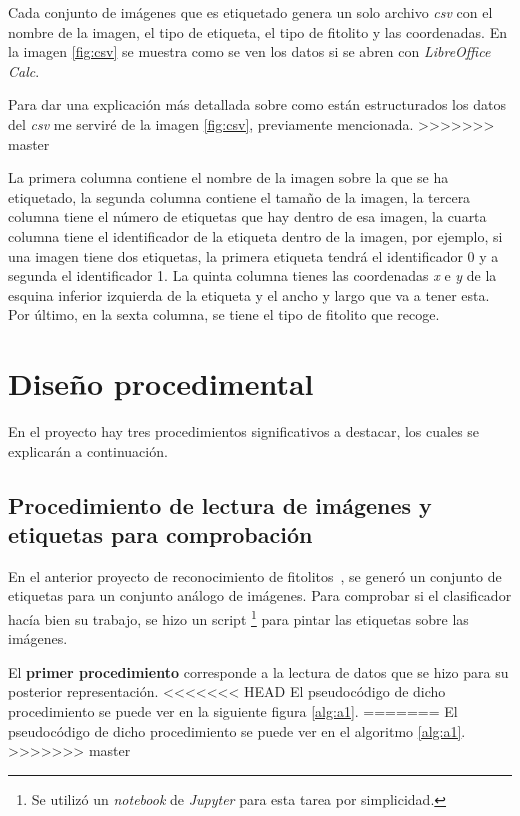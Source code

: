Cada conjunto de imágenes que es etiquetado genera un solo archivo \textit{csv} con el nombre de la imagen, el tipo de etiqueta, el tipo de fitolito y las coordenadas. En la imagen \ref{fig:csv} se muestra como se ven los datos si se abren con \textit{LibreOffice Calc}.

Para dar una explicación más detallada sobre como están estructurados los datos del \textit{csv} me serviré de la imagen \ref{fig:csv}, previamente mencionada.
>>>>>>> master

La primera columna contiene el nombre de la imagen sobre la que se ha etiquetado, la segunda columna contiene el tamaño de la imagen, la tercera columna tiene el número de etiquetas que hay dentro de esa imagen, la cuarta columna tiene el identificador de la etiqueta dentro de la imagen, por ejemplo, si una imagen tiene dos etiquetas, la primera etiqueta tendrá el identificador 0 y a segunda el identificador 1. La quinta columna tienes las coordenadas \textit{x} e \textit{y} de la esquina inferior izquierda de la etiqueta y el ancho y largo que va a tener esta. Por último, en la sexta columna, se tiene el tipo de fitolito que recoge.
\section{Diseño procedimental}
En el proyecto hay tres procedimientos significativos a destacar, los cuales se explicarán a continuación.

\subsection{Procedimiento de lectura de imágenes y etiquetas para comprobación}

En el anterior proyecto de reconocimiento de fitolitos~\cite{jaime}, se generó un conjunto de etiquetas para un conjunto análogo de imágenes.
Para comprobar si el clasificador hacía bien su trabajo, se hizo un script \footnote{Se utilizó un \textit{notebook} de \textit{Jupyter} para esta tarea por simplicidad.} para pintar las etiquetas sobre las imágenes.

El \textbf{primer procedimiento} corresponde a la lectura de datos que se hizo para su posterior representación.
<<<<<<< HEAD
El pseudocódigo de dicho procedimiento se puede ver en la siguiente figura \ref{alg:a1}.
=======
El pseudocódigo de dicho procedimiento se puede ver en el algoritmo \ref{alg:a1}.
>>>>>>> master

